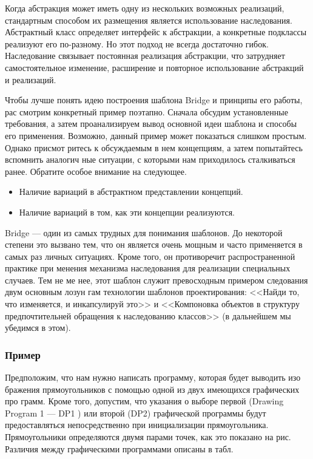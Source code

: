\documentclass[10pt]{article}
\begin{document}
Когда абстракция может иметь одну из нескольких возможных реализаций,
стандартным способом их размещения является использование наследования.
Абстрактный класс определяет интерфейс к абстракции, а конкретные подклассы
реализуют его по-разному. Но этот подход не всегда достаточно гибок. Наследование связывает
постоянная реализация абстракции, что затрудняет самостоятельное изменение, расширение и повторное использование абстракций и реализаций.


Чтобы лучше понять идею построения шаблона Bridge и принципы его работы, рас
смотрим конкретный пример поэтапно. Сначала обсудим установленные требования, а
затем проанализируем вывод основной идеи шаблона и способы его применения.
Возможно, данный пример может показаться слишком простым. Однако присмот
ритесь к обсуждаемым в нем концепциям, а затем попытайтесь вспомнить аналогич
ные ситуации, с которыми нам приходилось сталкиваться ранее. Обратите особое
внимание на следующее.
\begin{itemize}
\item Наличие вариаций в абстрактном представлении концепций.
\item Наличие вариаций в том, как эти концепции реализуются.
\end{itemize}

Bridge --- один из самых трудных для понимания шаблонов. До некоторой степени
это вызвано тем, что он является очень мощным и часто применяется в самых раз
личных ситуациях. Кроме того, он противоречит распространенной практике при
менения механизма наследования для реализации специальных случаев. Тем не ме
нее, этот шаблон служит превосходным примером следования двум основным лозун
гам технологии шаблонов проектирования: <<Найди то, что изменяется, и инкапсулируй это>>
и <<Компоновка объектов в структуру предпочтительней обращения к наследованию классов>> (в дальнейшем мы убедимся в этом).

\subsubsection{Пример}
Предположим, что нам нужно написать программу, которая будет выводить изо
бражения прямоугольников с помощью одной из двух имеющихся графических про
грамм. Кроме того, допустим, что указания о выборе первой (Drawing Program 1 --- 
DP1 ) или второй (DP2) графической программы будут
предоставляться непосредственно при инициализации
прямоугольника.
Прямоугольники определяются двумя парами точек, как это показано на рис.
Различия между графическими программами описаны в табл.
\end{document}
